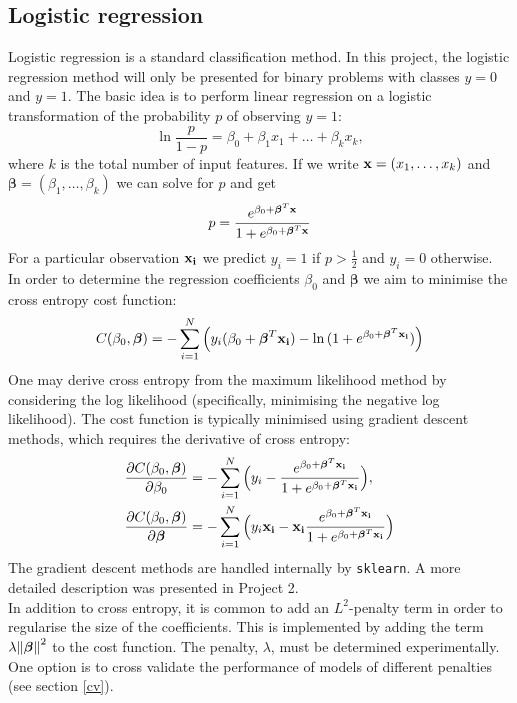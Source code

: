 \documentclass[notitlepage, reprint, nofootinbib]{revtex4-1}
\begin{document}
\subsection{Logistic regression}
Logistic regression is a standard classification method. In this project, the logistic regression method will only be presented for binary problems with classes $y=0$ and $y=1$. The basic idea is to perform linear regression on a logistic transformation of the probability $p$ of observing $y=1$: 
\begin{equation}\ln \frac{p}{1-p}=\beta_0+\beta_1x_1+\dots + \beta_k x_k, \end{equation}
where $k$ is the total number of input features. If we write $\vb{x}=(x_1,\dots,x_k)$ and $\boldsymbol{\beta}=(\beta_1,\dots,\beta_k)$ we can solve for $p$ and get 
\begin{equation}p=\frac{e^{\beta_0+\boldsymbol{\beta}^T\vb{x}}}{1 +  e^{\beta_0+\boldsymbol{\beta}^T\vb{x}}}\end{equation}
For a particular observation $\vb{x_i}$ we predict $y_i=1$ if $p>\frac{1}{2}$ and $y_i=0$ otherwise.  \\[2mm]
In order to determine the regression coefficients $\beta_0$ and $\boldsymbol{\beta}$ we aim to minimise the cross entropy cost function\cite{lecturenotes4}: 
\begin{equation}C(\beta_0, \boldsymbol{\beta})=-\sum_{i=1}^N \Big(y_i(\beta_0+\boldsymbol{\beta}^T\vb{x_i})-\ln{}(1+e^{\beta_0+\boldsymbol{\beta}^T\vb{x_i}})\Big)\end{equation}
One may derive cross entropy from the maximum likelihood method by considering the log likelihood (specifically, minimising the negative log likelihood). The cost function is typically minimised using gradient descent methods, which requires the derivative of cross entropy: 
\begin{align}
	\pdv{C(\beta_0, \boldsymbol{\beta})}{\beta_0}&=-\sum_{i=1}^N\Big(y_i-\frac{e^{\beta_0+\boldsymbol{\beta}^T\vb{x_i}}}{1+e^{\beta_0+\boldsymbol{\beta}^T\vb{x_i}}}\Big),\\
	\pdv{C(\beta_0, \boldsymbol{\beta})}{\boldsymbol{\beta}}&=-\sum_{i=1}^N\Big(y_i\vb{x_i} - \vb{x_i}\frac{e^{\beta_0+\boldsymbol{\beta}^T\vb{x_i}}}{1+e^{\beta_0+\boldsymbol{\beta}^T\vb{x_i}}}\Big)
\end{align}	
The gradient descent methods are handled internally by \texttt{sklearn}. A more detailed description was presented in Project 2. \cite{project2} \\[2mm]
In addition to cross entropy, it is common to add an $L^2$-penalty term in order to regularise the size of the coefficients. This is implemented by adding the term $\lambda\norm{\boldsymbol{\beta}}^2$ to the cost function. The penalty, $\lambda$, must be determined experimentally. One option is to cross validate the performance of models of different penalties (see section \ref{cv}).
\end{document}
